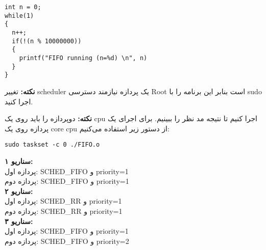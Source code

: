 \begin{latin}
\begin{lstlisting}
int n = 0;
while(1)
{
  n++;
  if(!(n % 10000000))
  {
  	printf("FIFO running (n=%d) \n", n)
  }
}		
\end{lstlisting}
\end{latin}

\textbf{نکته: }تغییر scheduler یک پردازه نیازمند دسترسی Root است بنابر این برنامه را با sudo اجرا کنید.

\textbf{نکته: }دوپردازه را باید روی یک cpu اجرا کنیم تا نتیجه مد نظر را ببینیم. برای اجرای یک پردازه روی یک core cpu از دستور زیر استفاده می‌کنیم:


\begin{latin}
\texttt{sudo taskset -c 0 ./FIFO.o}
\end{latin}

\textbf{سناریو ۱:‌}\\
پردازه اول:‌ SCHED\_FIFO و priority=1\\
پردازه دوم:‌ SCHED\_FIFO و priority=1\\

\textbf{سناریو ۲:}\\
پردازه اول:‌ SCHED\_RR و priority=1\\
پردازه دوم:‌ SCHED\_RR و priority=1\\

\textbf{سناریو ۳:}\\
پردازه اول:‌ SCHED\_FIFO و priority=1\\
پردازه دوم:‌ SCHED\_FIFO و priority=2\\



